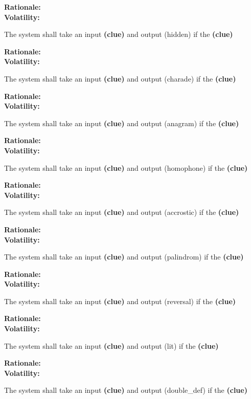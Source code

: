 \textbf{Rationale:}  \\
\textbf{Volatility:} 

\noindent\llap{\textbf{[R10/1]}}The system shall take an input \textbf{(clue)} and output (hidden) if the \textbf{(clue)}

\textbf{Rationale:}  \\
\textbf{Volatility:} 

\noindent\llap{\textbf{[R11/1]}}The system shall take an input \textbf{(clue)} and output (charade) if the \textbf{(clue)}

\textbf{Rationale:}  \\
\textbf{Volatility:} 

\noindent\llap{\textbf{[R12/1]}}The system shall take an input \textbf{(clue)} and output (anagram) if the \textbf{(clue)}

\textbf{Rationale:}  \\
\textbf{Volatility:} 

\noindent\llap{\textbf{[R13/1]}}The system shall take an input \textbf{(clue)} and output (homophone) if the \textbf{(clue)}

\textbf{Rationale:}  \\
\textbf{Volatility:} 

\noindent\llap{\textbf{[R14/1]}}The system shall take an input \textbf{(clue)} and output (accrostic) if the \textbf{(clue)}

\textbf{Rationale:}  \\
\textbf{Volatility:} 

\noindent\llap{\textbf{[R15/1]}}The system shall take an input \textbf{(clue)} and output (palindrom) if the \textbf{(clue)}

\textbf{Rationale:}  \\
\textbf{Volatility:} 

\noindent\llap{\textbf{[R16/1]}}The system shall take an input \textbf{(clue)} and output (reversal) if the \textbf{(clue)}

\textbf{Rationale:}  \\
\textbf{Volatility:} 

\noindent\llap{\textbf{[R17/1]}}The system shall take an input \textbf{(clue)} and output (lit) if the \textbf{(clue)}

\textbf{Rationale:}  \\
\textbf{Volatility:} 

\noindent\llap{\textbf{[R18/1]}}The system shall take an input \textbf{(clue)} and output (double\_def) if the \textbf{(clue)}

